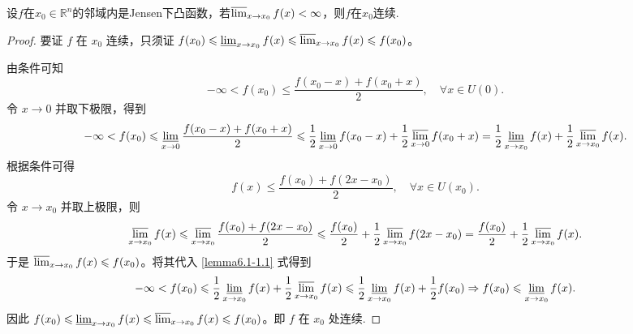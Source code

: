 \documentclass[../../main.tex]{subfiles}%
\begin{document}
\begin{lemma}\label{lemma:关于Jensen下凸与连续的引理}
设\(f\)在\(x_0\in\mathbb{R}^n\)的邻域内是Jensen下凸函数，若\(\varlimsup_{x\rightarrow x_0}f(x)<\infty\)，则\(f\)在\(x_0\)连续.
\end{lemma}
\begin{proof}

要证 \(f\) 在 \(x_0\) 连续，只须证 \(f(x_0) \leqslant \varliminf_{x \to x_0} f(x) \leqslant \varlimsup_{x \to x_0} f(x) \leqslant f(x_0)\)。

由条件可知
\[
-\infty < f(x_0) \leqslant \frac{f(x_0 - x) + f(x_0 + x)}{2}, \quad \forall x \in U(0).
\]
令 \(x \to 0\) 并取下极限，得到
\begin{align}
-\infty < f(x_0) \leqslant \varliminf_{x \to 0} \frac{f(x_0 - x) + f(x_0 + x)}{2} 
\leqslant \frac{1}{2} \varliminf_{x \to 0} f(x_0 - x) + \frac{1}{2} \varlimsup_{x \to 0} f(x_0 + x) 
= \frac{1}{2} \varliminf_{x \to x_0} f(x) + \frac{1}{2} \varlimsup_{x \to x_0} f(x). \label{lemma6.1-1.1}
\end{align}
根据条件可得
\[
f(x) \leqslant \frac{f(x_0) + f(2x - x_0)}{2}, \quad \forall x \in U(x_0).
\]
令 \(x \to x_0\) 并取上极限，则
\begin{align*}
\varlimsup_{x \to x_0} f(x)\leqslant \varlimsup_{x \to x_0} \frac{f(x_0) + f(2x - x_0)}{2} 
\leqslant \frac{f(x_0)}{2} + \frac{1}{2} \varlimsup_{x \to x_0} f(2x - x_0) 
= \frac{f(x_0)}{2} + \frac{1}{2} \varlimsup_{x \to x_0} f(x).
\end{align*}
于是 \(\varlimsup_{x \to x_0} f(x) \leqslant f(x_0)\)。将其代入 \eqref{lemma6.1-1.1} 式得到
\begin{align*}
-\infty < f(x_0) \leqslant \frac{1}{2} \varliminf_{x \to x_0} f(x) + \frac{1}{2} \varlimsup_{x \to x_0} f(x) 
\leqslant \frac{1}{2} \varliminf_{x \to x_0} f(x) + \frac{1}{2} f(x_0) 
\Rightarrow f(x_0) \leqslant \varliminf_{x \to x_0} f(x).
\end{align*}
因此 \(f(x_0) \leqslant \varliminf_{x \to x_0} f(x) \leqslant \varlimsup_{x \to x_0} f(x) \leqslant f(x_0)\)。即 \(f\) 在 \(x_0\) 处连续.

\end{proof}
\end{document}
